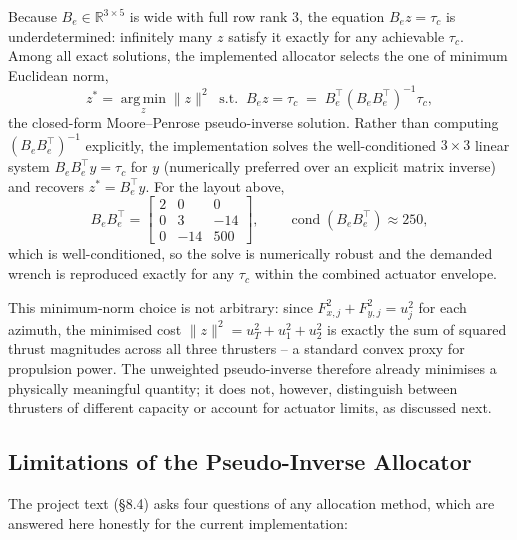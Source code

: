 \documentclass[10pt,conference]{IEEEtran}
\begin{document}
Because $B_e\in\mathbb{R}^{3\times5}$ is wide with full row rank
$3$, the equation $B_e z=\tau_c$ is underdetermined: infinitely many
$z$ satisfy it exactly for any achievable $\tau_c$. Among all exact
solutions, the implemented allocator selects the one of minimum
Euclidean norm,
\begin{equation}
z^\ast = \operatorname*{arg\,min}_{z}\|z\|^2 \;\;\text{s.t.}\;\; B_e z
= \tau_c \;=\; B_e^\top\left(B_e B_e^\top\right)^{-1}\tau_c,
\label{eq:pinv}
\end{equation}
the closed-form Moore--Penrose pseudo-inverse solution. Rather than
computing $(B_e B_e^\top)^{-1}$ explicitly, the implementation solves
the well-conditioned $3\times3$ linear system $B_e B_e^\top y = \tau_c$
for $y$ (numerically preferred over an explicit matrix inverse) and
recovers $z^\ast = B_e^\top y$. For the layout above,
\begin{equation}
B_e B_e^\top = \begin{bmatrix} 2 & 0 & 0 \\ 0 & 3 & -14 \\ 0 & -14 &
500 \end{bmatrix}, \qquad \operatorname{cond}\!\left(B_e
B_e^\top\right) \approx 250,
\end{equation}
which is well-conditioned, so the solve is numerically robust and the
demanded wrench is reproduced exactly for any $\tau_c$ within the
combined actuator envelope.

This minimum-norm choice is not arbitrary: since
$F_{x,j}^2+F_{y,j}^2=u_j^2$ for each azimuth, the minimised cost
$\|z\|^2 = u_T^2+u_1^2+u_2^2$ is exactly the sum of squared thrust
magnitudes across all three thrusters -- a standard convex proxy for
propulsion power. The unweighted pseudo-inverse therefore already
minimises a physically meaningful quantity; it does not, however,
distinguish between thrusters of different capacity or account for
actuator limits, as discussed next.

\subsection{Limitations of the Pseudo-Inverse Allocator}
\label{sec:alloc-limits}

The project text (\S8.4) asks four questions of any allocation method,
which are answered here honestly for the current implementation:
\end{document}
